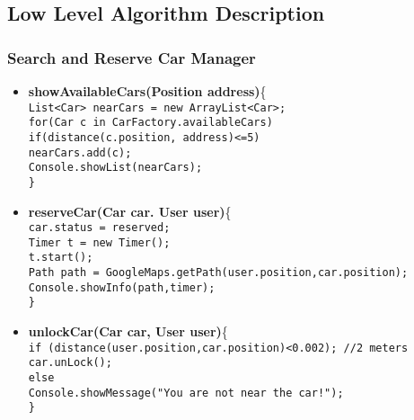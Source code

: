 \subsection{Low Level Algorithm Description}
\subsubsection{Search and Reserve Car Manager}
\begin{itemize}
\item \textbf{showAvailableCars(Position address)}\{\\
\texttt{List<Car> nearCars = new ArrayList<Car>; \\
for(Car c in CarFactory.availableCars)\\
\tab if(distance(c.position, address)<=5)\\
\tab \tab nearCars.add(c);\\
Console.showList(nearCars);\\
\}\\
}



\item \textbf{reserveCar(Car car. User user)}\{\\
\texttt{car.status = reserved;\\
Timer t = new Timer();\\
t.start();\\
Path path = GoogleMaps.getPath(user.position,car.position);\\
Console.showInfo(path,timer);\\
\}\\
}
\item \textbf {unlockCar(Car car, User user)}\{\\
\texttt{if (distance(user.position,car.position)<0.002); //2 meters\\
\tab car.unLock();\\
else \\
\tab Console.showMessage("You are not near the car!");\\
\}\\
}
\end{itemize}

